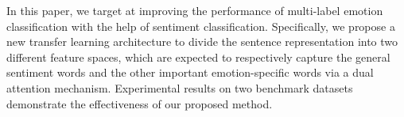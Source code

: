 In this paper, we target at improving the performance of multi-label emotion classification with the help of sentiment classification. Specifically, we propose a new transfer learning architecture to divide the sentence representation into two different feature spaces, which are expected to respectively capture the general sentiment words and the other important emotion-specific words via a dual attention mechanism. Experimental results on two benchmark datasets demonstrate the effectiveness of our proposed method.
